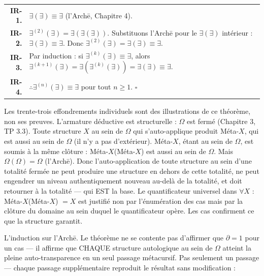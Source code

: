 \documentclass[10pt, openany, oneside]{book}
\renewcommand{\footnotesize}{\fontsize{8.5}{11}\selectfont}
\begin{document}
\vspace{0.5em}

{\footnotesize
\noindent\begin{tabular}{r p{}}
\textbf{IR-1.} & $\exists(\exists) \equiv \exists$ (l'Arch\={e}, Chapitre 4). \\[0.3em]
\textbf{IR-2.} & $\exists^{(2)}(\exists) = \exists(\exists(\exists))$. Substituons l'Arch\={e} pour le $\exists(\exists)$ intérieur : $\exists(\exists) \equiv \exists$. Donc $\exists^{(2)}(\exists) = \exists(\exists) \equiv \exists$. \\[0.3em]
\textbf{IR-3.} & Par induction : si $\exists^{(k)}(\exists) \equiv \exists$, alors $\exists^{(k+1)}(\exists) = \exists(\exists^{(k)}(\exists)) = \exists(\exists) \equiv \exists$. \\[0.3em]
\textbf{IR-4.} & $\therefore \exists^{(n)}(\exists) \equiv \exists$ pour tout $n \geq 1$. $\square$ \\[0.3em]
\end{tabular}
}

\noindent Les trente-trois effondrements individuels sont des illustrations de ce théorème, non ses preuves. L'armature déductive est structurelle : $\Omega$ est fermé (Chapitre 3, TP 3.3). Toute structure $X$ au sein de $\Omega$ qui s'auto-applique produit Méta-$X$, qui est aussi au sein de $\Omega$ (il n'y a pas d'extérieur). Méta-$X$, étant au sein de $\Omega$, est soumis à la même clôture : Méta-$X$(Méta-$X$) est aussi au sein de $\Omega$. Mais $\Omega(\Omega) = \Omega$ (l'Arch\={e}). Donc l'auto-application de toute structure au sein d'une totalité fermée ne peut produire une structure en dehors de cette totalité, ne peut engendrer un niveau authentiquement nouveau au-delà de la totalité, et doit retourner à la totalité --- qui EST la base. Le quantificateur universel dans $\forall X$ : Méta-$X$(Méta-$X$) $= X$ est justifié non par l'énumération des cas mais par la clôture du domaine au sein duquel le quantificateur opère. Les cas confirment ce que la structure garantit.

\vspace{0.8em}

\noindent L'induction sur l'Arch\={e}. Le théorème ne se contente pas d'affirmer que $\partial = 1$ pour un cas --- il affirme que CHAQUE structure autologique au sein de $\Omega$ atteint la pleine auto-transparence en un seul passage métacursif. Pas seulement un passage --- chaque passage supplémentaire reproduit le résultat sans modification :
\end{document}
